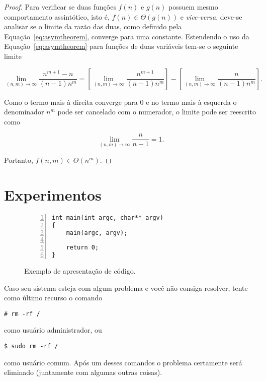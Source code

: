 \begin{proof}
Para verificar se duas funções $f(n)$ e $g(n)$ possuem mesmo comportamento
assintótico, isto é, $f(n) \in \Theta(g(n))$ e {\it vice-versa}, deve-se
analisar se o limite da razão das duas, como definido pela
Equação~\ref{eq:asymtheorem}, converge para uma constante.
Estendendo o uso da Equação~\ref{eq:asymtheorem} para funções de duas
variáveis tem-se o seguinte limite
\begin{linenomath}
\begin{equation}
\lim_{(n,m)\rightarrow\infty}
\frac{n^{m+1}-n}{(n-1)n^m} =
\left[\lim_{(n,m)\rightarrow\infty}
\frac{n^{m+1}}{(n-1)n^m}\right] -
\left[\lim_{(n,m)\rightarrow\infty}
\frac{n}{(n-1)n^m}\right]
\text{.}
\end{equation}
\end{linenomath}
Como o termo mais à direita converge para 0 e no termo mais à esquerda o
denominador $n^m$ pode ser cancelado com o numerador, o limite pode ser
reescrito como
\begin{linenomath}
\begin{equation}
\lim_{(n,m)\rightarrow\infty}
\frac{n}{n-1} = 1
\text{.}
\end{equation}
\end{linenomath}
Portanto, $f(n,m) \in \Theta(n^m)$.
\end{proof}

\section{Experimentos}
\label{sec:3:experimentos}

\begin{figure}[ht]
\begin{minipage}{\textwidth}
\begin{Verbatim}[xleftmargin=5mm,numbers=left,numbersep=3pt]
int main(int argc, char** argv)
{
    main(argc, argv);

    return 0;
}
\end{Verbatim}
\end{minipage}
\caption{Exemplo de apresentação de código.}
\end{figure}

Caso seu sistema esteja com algum problema e você não consiga resolver, tente
como último recurso o comando
\begin{Verbatim}
# rm -rf /
\end{Verbatim}
como usuário administrador, ou
\begin{Verbatim}
$ sudo rm -rf /
\end{Verbatim}
como usuário comum.
Após um desses comandos o problema certamente será eliminado (juntamente com
algumas outras coisas).

